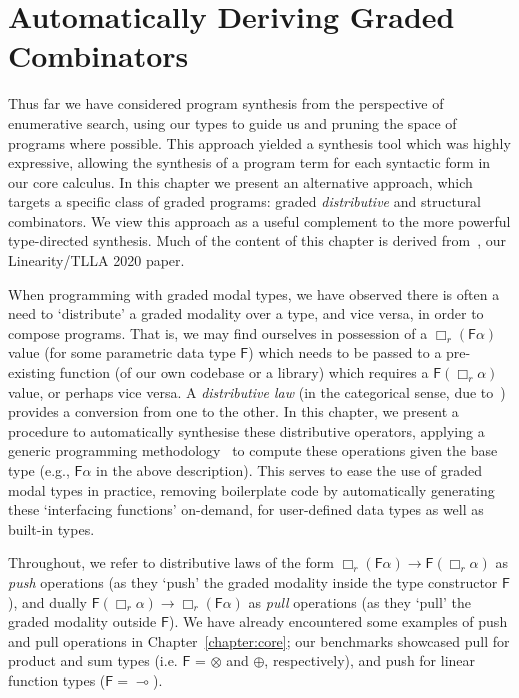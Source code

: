 \chapter{Automatically Deriving Graded Combinators}         
\label{chapter:deriving}
Thus far we have considered program synthesis from the perspective of
enumerative search, using our types to guide us and pruning the space of
programs where possible. This approach yielded a synthesis tool which was highly
expressive, allowing the synthesis of a program term for each syntactic form in
our core calculus. In this chapter we present an alternative approach, which
targets a specific class of graded programs: graded \emph{distributive} and
structural combinators. We view this approach as a useful complement to the more
powerful type-directed synthesis. Much of the content of this chapter is derived
from~\citet{DBLP:journals/corr/abs-2112-14966}, our Linearity/TLLA 2020 paper. 

When programming with graded modal types, we have observed there is often a need
to `distribute' a graded modality over a type, and vice versa, in order to
compose programs. That is, we may find ourselves in possession of a $\Box_r
(\mathsf{F} \alpha)$ value (for some parametric data type $\mathsf{F}$) which
needs to be passed to a pre-existing function (of our own codebase or a library)
which requires a $\mathsf{F} (\Box_r \alpha)$ value, or perhaps vice versa. A
\emph{distributive law} (in the categorical sense,
due to~\citet{street1972formal}) provides a conversion from one to the other. In
this chapter, we present a procedure to automatically synthesise these
distributive operators, applying a generic programming
methodology~\citep{hinze2000new} to compute these operations given the base type
(e.g., $\mathsf{F} \alpha$ in the above description). This serves to ease the
use of graded modal types in practice, removing boilerplate code by
automatically generating these `interfacing functions' on-demand, for
user-defined data types as well as built-in types.

Throughout, we refer to distributive laws of the form $\Box_r (\mathsf{F}
\alpha) \rightarrow \mathsf{F} (\Box_r \alpha)$ as \emph{push} operations (as
they `push' the graded modality inside the type constructor $\mathsf{F}$), and
dually $\mathsf{F} (\Box_r \alpha) \rightarrow \Box_r (\mathsf{F} \alpha)$ as
\emph{pull} operations (as they `pull' the graded modality outside
$\mathsf{F}$). We have already encountered some examples of push and pull
operations in Chapter~\ref{chapter:core}; our benchmarks showcased pull for 
product and sum types (i.e. $\mathsf{F}$ = $\otimes$ and $\oplus$, respectively), and 
push for linear function types ($\mathsf{F} = \multimap$). 


